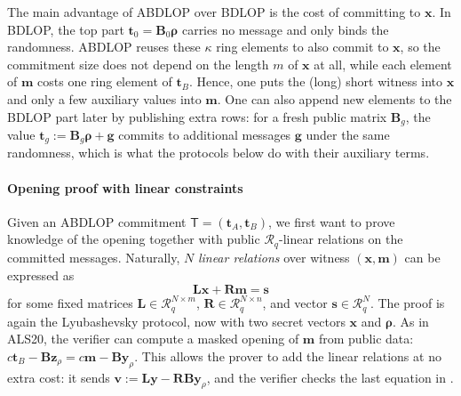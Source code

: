 \documentclass[../../book.tex]{subfiles}
\begin{document}
The main advantage of ABDLOP over BDLOP is the cost of committing to $\mathbf{x}$.
In BDLOP, the top part $\mathbf{t}_0 = \mathbf{B}_0\boldsymbol{\rho}$ carries no message and only binds the randomness.
ABDLOP reuses these $\kappa$ ring elements to also commit to $\mathbf{x}$, so the commitment size does not depend on the length $m$ of $\mathbf{x}$ at all, while each element of $\mathbf{m}$ costs one ring element of $\mathbf{t}_B$.
Hence, one puts the (long) short witness into $\mathbf{x}$ and only a few auxiliary values into $\mathbf{m}$.
One can also append new elements to the BDLOP part later by publishing extra rows: for a fresh public matrix $\mathbf{B}_g$, the value $\mathbf{t}_g := \mathbf{B}_g\boldsymbol{\rho} + \mathbf{g}$ commits to additional messages $\mathbf{g}$ under the same randomness, which is what the protocols below do with their auxiliary terms.

\paragraph{Opening proof with linear constraints}
Given an ABDLOP commitment $\mathsf{T} = (\mathbf{t}_A, \mathbf{t}_B)$, we first want to prove knowledge of the opening together with public $\mathcal{R}_q$-linear relations on the committed messages.
Naturally, $N$ \emph{linear relations} over witness $(\mathbf{x},\mathbf{m})$ can be expressed as
\begin{equation*}
    \mathbf{L}\mathbf{x} + \mathbf{R}\mathbf{m} = \mathbf{s}
\end{equation*}
for some fixed matrices $\mathbf{L} \in \mathcal{R}_q^{N \times m}$, $\mathbf{R} \in \mathcal{R}_q^{N \times n}$, and vector $\mathbf{s} \in \mathcal{R}_q^{N}$.
The proof is again the Lyubashevsky protocol, now with two secret vectors $\mathbf{x}$ and $\boldsymbol{\rho}$.
As in ALS20, the verifier can compute a masked opening of $\mathbf{m}$ from public data: $c\mathbf{t}_B - \mathbf{B}\mathbf{z}_{\rho} = c\mathbf{m} - \mathbf{B}\mathbf{y}_{\rho}$.
This allows the prover to add the linear relations at no extra cost: it sends $\mathbf{v} := \mathbf{L}\mathbf{y} - \mathbf{R}\mathbf{B}\mathbf{y}_{\rho}$, and the verifier checks the last equation in .
\end{document}
